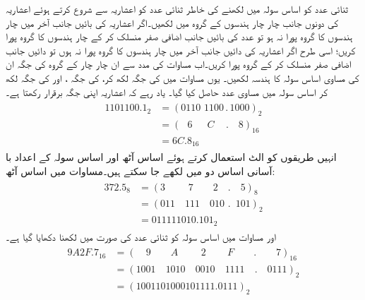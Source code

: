 	ثنائی عدد کو اساس سولہ میں لکھنے کی خاطر ثنائی عدد کو اعشاریہ سے شروع کرتے ہوئے اعشاریہ کی  دونوں جانب  چار چار ہندسوں کے گروہ میں لکھیں۔اگر اعشاریہ کی بائیں جانب آخر میں چار ہندسوں کا گروہ پورا نہ ہو تو عدد کی  بائیں جانب اضافی  صفر منسلک  کر کے  چار ہندسوں  کا گروہ  پورا کریں؛ اسی طرح  اگر اعشاریہ کی دائیں جانب آخر میں چار ہندسوں کا گروہ  پورا نہ ہوں تو دائیں جانب  اضافی صفر منسلک کر کے گروہ پورا کریں۔اب مساوات     کی مدد سے ان چار چار کے گروہ کی جگہ ان کی  مساوی اساس سولہ کا ہندسہ لکھیں۔ یوں مساوات    میں   کی جگہ  لکھ کر،   کی جگہ ،  اور     کی جگہ     لکھ کر   اساس سولہ میں مساوی   عدد حاصل کیا گیا۔ یاد رہے کہ اعشاریہ اپنی جگہ برقرار رکھتا ہے۔
\begin{gather}
\begin{aligned}\label{مساوات_ثنائی_سولہ_تبدیل}
1101100.1_2&=(0110  \,\,1100\,  . \, 1000)_2\\
&=(\phantom{0}\, 6\,\,\quad \,C\quad\, .\quad 8)_{16}\\
&=6C.8_{16}
\end{aligned}
\end{gather}
	انہیں طریقوں کو الٹ استعمال کرتے ہوئے اساس آٹھ اور اساس سولہ کے اعداد با آسانی اساس دو میں لکھے جا سکتے ہیں۔مساوات    میں اساس آٹھ:
 \begin{gather}
 \begin{aligned}\label{مساوات_ثنائی_آٹھ_تبدیل_اساس}
 372.5_8&=(3\quad\quad \,\, 7\quad\quad  2\quad  . \quad  5)_8\\
 &=(011\quad 111 \quad 010\,\,. \,\,\, 101)_2\\
 &=011111010.101_2
 \end{aligned}
 \end{gather}
 اور مساوات   میں اساس سولہ کو ثنائی عدد کی صورت  میں لکھنا دکھایا گیا ہے۔ 
\begin{gather}
 \begin{aligned}\label{مساوات_ثنائی_سولہ_تبدیل_اساس}
 9A2F.7_{16}&=(\quad 9 \quad \quad A\quad\quad  \,\, 2\quad \quad \, F\quad \quad . \quad \quad 7)_{16}\\
 &=(1001\quad 1010\quad 0010\quad 1111\quad . \quad 0111)_2\\
 &=(1001101000101111.0111)_2
 \end{aligned}
 \end{gather}
